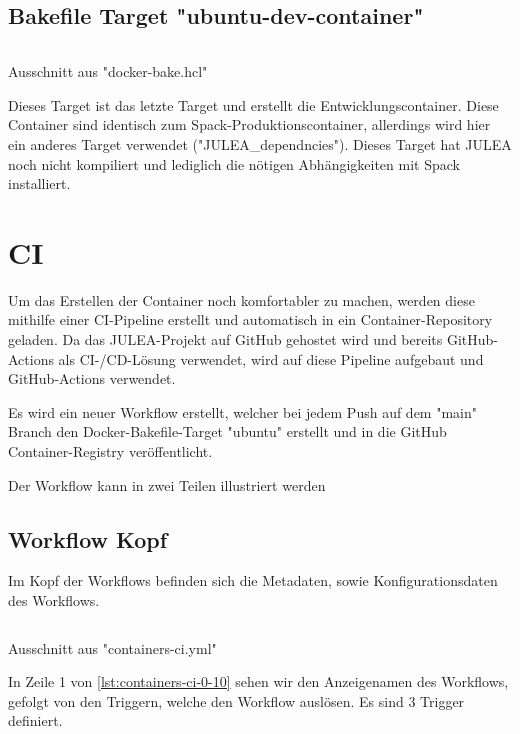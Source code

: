 \subsection{Bakefile Target "ubuntu-dev-container"}

\begin{listing}[H]
    \inputminted[firstline=58]{./lexers/docker-bake-lexer.py}{./code-examples/docker-bake.hcl}
    \caption{Ausschnitt aus "docker-bake.hcl"}
\end{listing}

Dieses Target ist das letzte Target und erstellt die Entwicklungscontainer. Diese Container sind identisch zum Spack-Produktionscontainer, allerdings wird hier ein anderes Target verwendet ("JULEA\_dependncies"). Dieses Target hat JULEA noch nicht kompiliert und lediglich die nötigen Abhängigkeiten mit Spack installiert.

\pagebreak

\section{CI}

Um das Erstellen der Container noch komfortabler zu machen, werden diese mithilfe einer CI-Pipeline erstellt und automatisch in ein Container-Repository geladen. Da das JULEA-Projekt auf GitHub gehostet wird und bereits GitHub-Actions als CI-/CD-Lösung verwendet, wird auf diese Pipeline aufgebaut und GitHub-Actions verwendet.

Es wird ein neuer Workflow erstellt, welcher bei jedem Push auf dem "main" Branch den Docker-Bakefile-Target "ubuntu" erstellt und in die GitHub Container-Registry veröffentlicht.

Der Workflow kann in zwei Teilen illustriert werden 


\subsection{Workflow Kopf}

Im Kopf der Workflows befinden sich die Metadaten, sowie Konfigurationsdaten des Workflows.

\begin{listing}[H]
    \inputminted[firstline=0,lastline=10]{yaml}{./code-examples/containers-ci.yml}
    \caption{Ausschnitt aus "containers-ci.yml"}
    \label{lst:containers-ci-0-10}
\end{listing}

In Zeile 1 von \cref{lst:containers-ci-0-10} sehen wir den Anzeigenamen des Workflows, gefolgt von den Triggern, welche den Workflow auslösen. Es sind 3 Trigger definiert. 

